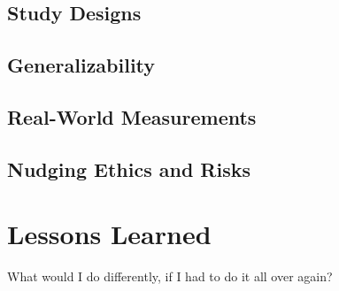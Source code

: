 \subsection{Study Designs}

\subsection{Generalizability}

\subsection{Real-World Measurements}

\subsection{Nudging Ethics and Risks}




\section{Lessons Learned}
What would I do differently, if I had to do it all over again?



